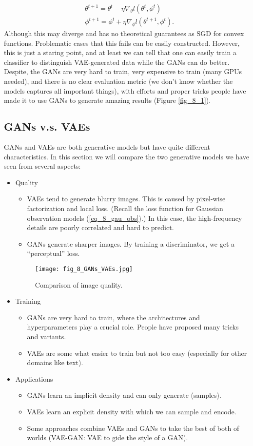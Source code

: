 \documentclass[../main.tex]{subfiles}
\begin{document}
\begin{align*}
&\theta^{t+1}=\theta^t-\eta \nabla_\theta l(\theta^t,\phi^t)\\
&\phi^{t+1}=\phi^t+\eta \nabla_\phi l(\theta^{t+1},\phi^t).
\end{align*}
Although this may diverge and has no theoretical guarantees as SGD for convex functions. Problematic cases that this fails can be easily constructed. However, this is just a staring point, and at least we can tell that one can easily train a classifier to distinguish VAE-generated data while the GANs can do better. Despite, the GANs are very hard to train, very expensive to train (many GPUs needed), and there is no clear evaluation metric (we don't know whether the models captures all important things), with efforts and proper tricks people have made it to use GANs to generate amazing results (Figure \ref{fig_8_1}).
\subsection{GANs v.s. VAEs}
GANs and VAEs are both generative models but have quite different characteristics. In this section we will compare the two generative models we have seen from several aspects:
\begin{itemize}
	\item Quality
	\begin{itemize}
		\item VAEs tend to generate blurry images. This is caused by pixel-wise factorization and local loss. (Recall the loss function for Gaussian observation models (\ref{eq_8_gau_obs}).) In this case, the high-frequency details are poorly correlated and hard to predict. 
		\item GANs generate sharper images. By training a discriminator, we get a ``perceptual'' loss.
	\end{itemize}
\begin{figure}[h] 
	\centering 
	\texttt{[image: fig\_8\_GANs\_VAEs.jpg]} 
	\caption{Comparison of image quality.}\label{fig_8_GANs_VAEs}
\end{figure}
	\item Training
	\begin{itemize}
		\item GANs are very hard to train, where the architectures and hyperparameters play a crucial role. People have proposed many tricks and variants.
		\item VAEs are some what easier to train but not too easy (especially for other domains like text).
	\end{itemize}
	\item Applications
	\begin{itemize}
		\item GANs learn an implicit density and can only generate (samples).
		\item VAEs learn an explicit density with which we can sample and encode.
		\item Some approaches combine VAEs and GANs to take the best of both of worlds (VAE-GAN: VAE to gide the style of a GAN).
	\end{itemize}
\end{itemize}
\end{document}
